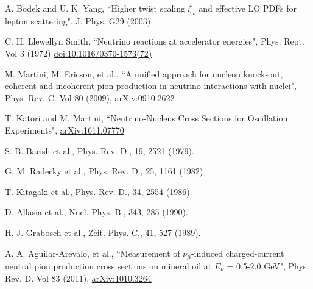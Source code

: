 \begin{thebibliography}{20}
A. Bodek and U. K. Yang, ``Higher twist scaling $\xi_\omega$ and effective LO PDFs for lepton scattering", J. Phys. G29 (2003) 


 C. H. Llewellyn Smith, ``Neutrino reactions at accelerator energies", Phys. Rept. Vol 3 (1972)
\href{https://inspirehep.net/record/67183/files/slac-pub-0958b.pdf}{doi:10.1016/0370-1573(72)}


 M. Martini, M. Ericson, et al., ``A unified approach for nucleon knock-out, coherent and incoherent pion production in neutrino interactions with nuclei", Phys. Rev. C. Vol 80 (2009), \href{https://arxiv.org/pdf/0910.2622.pdf}{arXiv:0910.2622}


 T. Katori and M. Martini, ``Neutrino-Nucleus Cross Sections for Oscillation Experiments",
\href{https://arxiv.org/pdf/1611.07770.pdf}{arXiv:1611.07770}


  S. B. Barish et al., Phys. Rev. D., 19, 2521 (1979).

 G. M. Radecky et al., Phys. Rev. D., 25, 1161 (1982)
 
 T. Kitagaki et al., Phys. Rev. D., 34, 2554 (1986)
 
 D. Allasia et al., Nucl. Phys. B., 343, 285 (1990).

 H. J. Grabosch et al., Zeit. Phys. C., 41, 527 (1989).

  A. A. Aguilar-Arevalo, et al., ``Measurement of $\nu_\mu$-induced charged-current neutral pion production cross sections on mineral oil at $E_\nu$ = 0.5-2.0 GeV", Phys. Rev. D. Vol 83 (2011), \href{https://arxiv.org/abs/1010.3264}{arXiv:1010.3264}


\end{thebibliography}
